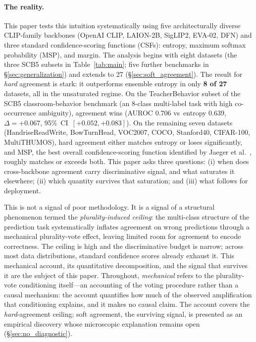 \documentclass[a4paper,fleqn]{cas-sc}
\newcommand{\scbfive}{\textsc{SCB5}}
\begin{document}
\paragraph{The reality.}
This paper tests this intuition systematically using five architecturally diverse CLIP-family backbones (OpenAI CLIP, LAION-2B, SigLIP2, EVA-02, DFN) and three standard confidence-scoring functions (CSFs): entropy, maximum softmax probability (MSP), and margin. The analysis begins with eight datasets (the three \scbfive{} subsets in Table~\ref{tab:main}; five further benchmarks in \S\ref{sec:generalization}) and extends to 27 (\S\ref{sec:soft_agreement}).
The result for \emph{hard} agreement is stark: it outperforms ensemble entropy in only \textbf{8 of 27} datasets, all in the unsaturated regime.
On the TeacherBehavior subset of the \scbfive{} classroom-behavior benchmark \citep{scb5} (an 8-class multi-label task with high co-occurrence ambiguity), agreement wins (AUROC 0.706 vs~entropy 0.639, $\Delta = +0.067$, 95\%~CI~$[+0.052,+0.083]$).
On the remaining seven datasets (HandriseReadWrite, BowTurnHead, VOC2007, COCO, Stanford40, CIFAR-100, MultiTHUMOS), hard agreement either matches entropy or loses significantly, and MSP, the best overall confidence-scoring function identified by Jaeger et al.\ \citep{jaeger2023call}, roughly matches or exceeds both. This paper asks three questions: (i) when does cross-backbone agreement carry discriminative signal, and what saturates it elsewhere; (ii) which quantity survives that saturation; and (iii) what follows for deployment.

This is not a signal of poor methodology.
It is a signal of a structural phenomenon termed the \emph{plurality-induced ceiling}: the multi-class structure of the prediction task systematically inflates agreement on wrong predictions through a mechanical plurality-vote effect, leaving limited room for agreement to encode correctness.
The ceiling is high and the discriminative budget is narrow; across most data distributions, standard confidence scores already exhaust it.
This mechanical account, its quantitative decomposition, and the signal that survives it are the subject of this paper. Throughout, \emph{mechanical} refers to the plurality-vote conditioning itself---an accounting of the voting procedure rather than a causal mechanism: the account quantifies how much of the observed amplification that conditioning explains, and it makes no causal claim. The account covers the \emph{hard}-agreement ceiling; soft agreement, the surviving signal, is presented as an empirical discovery whose microscopic explanation remains open (\S\ref{sec:no_diagnostic}).
\end{document}

